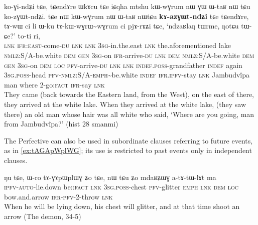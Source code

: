 \documentclass[oldfontcommands,oneside,a4paper,11pt]{article}
\newcommand{\ipa}[1]{{\phon \mbox{#1}}} %
\newcommand{\factual}[1]{\textsc{:fact}}
\begin{document}
\begin{exe}
\ex \label{ex:kazGWtndZi}
\gll \ipa{tɕendɤre} 	\ipa{ko-ɣi-ndʑi} 	\ipa{tɕe,} 	\ipa{tɕendɤre} 	\ipa{ɯkɤcu} 	\ipa{tɕe} 	\ipa{iɕqha} 	\ipa{mtshu} 	\ipa{kɯ-wɣrum} 	\ipa{nɯ} 	\ipa{ɣɯ} 	\ipa{ɯ-taʁ} 	\ipa{nɯ} \ipa{tɕu} 	\ipa{ko-zɣɯt-ndʑi.} \ipa{tɕe} 	\ipa{nɯ} 	\ipa{kɯ-wɣrum} 	\ipa{nɯ} 	\ipa{ɯ-taʁ} 	\ipa{nɯtɕu} 	\textbf{\ipa{kɤ-azɣɯt-ndʑi}} 	\ipa{tɕe} 	\ipa{tɕendɤre,} 
\ipa{tɤ-wɯ} 	\ipa{ci} 	\ipa{li} 	\ipa{ɯ-ku} 	\ipa{tɤ-kɯ-wɣrɯ\textasciitilde{}wɣrum} 	\ipa{ci} 	\ipa{pjɤ-rɤʑi} \ipa{tɕe,} \ipa{`ndzaʁlaŋ} 	\ipa{tɯrme,} 	\ipa{ŋotɕu} 	\ipa{tɯ-ɕe?'} 	\ipa{to-ti} 	\ipa{ri,} \\
\textsc{lnk} \textsc{ifr:east}-come-\textsc{du} \textsc{lnk}  \textsc{lnk} \textsc{3sg}-in.the.east  \textsc{lnk} the.aforementioned lake \textsc{nmlz}:S/A-be.white \textsc{dem} \textsc{gen} \textsc{3sg}-on \textsc{ifr}-arrive-\textsc{du} \textsc{lnk} \textsc{dem} \textsc{nmlz}:S/A-be.white \textsc{dem} \textsc{gen} \textsc{3sg}-on \textsc{dem} \textsc{loc} \textsc{pfv}-arrive-\textsc{du}  \textsc{lnk}  \textsc{lnk} \textsc{indef.poss}-grandfather \textsc{indef} again \textsc{3sg.poss}-head \textsc{pfv}-\textsc{nmlz}:S/A-\textsc{emph}\textasciitilde{}be.white  \textsc{indef} \textsc{ifr.ipfv}-stay   \textsc{lnk} Jambudvîpa man where 2-go\factual{} \textsc{ifr}-say \textsc{lnk} \\
\glt They came (back towards the Eastern land, from the West), on the east of there, they arrived at the white lake. When they arrived at the white lake, (they saw there) an old man whose hair was all white who said, `Where are you going, man from Jambudvîpa?' (hist 28 smanmi)
\end{exe}

The Perfective can also be used in subordinate clauses referring to future events, as in \ref{ex:tAGApWplWG}; its use is restricted to past events only in independent clauses.

\begin{exe}
\ex \label{ex:tAGApWplWG}
\gll \ipa{ku-nɯ-rŋgɯ} 	\ipa{ŋu} 	\ipa{tɕe,} 	\ipa{ɯ-ro} 	\ipa{tɤ-ɣɤpɯplɯɣ} 	\ipa{ʑo} 	\ipa{tɕe,} 	\ipa{nɯ} 	\ipa{tɕu} 	\ipa{ʑo} 	\ipa{mdaʁʑɯɣ} 	\ipa{a-tɤ-tɯ-lɤt} 	\ipa{ma}  \\
\textsc{ipfv-auto}-lie.down be:\factual{} \textsc{lnk} \textsc{3sg.poss}-chest \textsc{pfv}-glitter \textsc{emph} \textsc{lnk} \textsc{dem} \textsc{loc} bow.and.arrow \textsc{irr-pfv}-2-throw \textsc{lnk} \\
\glt When he will be lying down, his chest will glitter, and at that time shoot an arrow (The demon, 34-5)
\end{exe}
\end{document}
